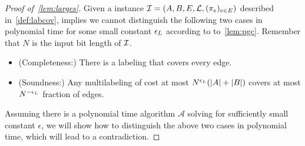 \begin{proof}[Proof of~\cref{lem:larges}]
	Given a \labcov{} instance $\mathcal{I}=(A,B,E,\mathcal{L},(\pi_e)_{e\in E})$ described in~\cref{def:labcov}, \conj{} implies we cannot distinguish the following two cases in polynomial time for some small constant $\epsilon_{L}{}$ according to to~\cref{lem:pgc}. Remember that $N$ is the input bit length of $\mathcal{I}$.
	
	\begin{itemize}
		\item (Completeness:) There is a labeling that covers every edge. 
		
		\item (Soundness:) Any multilabeling of cost at most $N^{\epsilon_{L}{}}(|A|+|B|)$ covers at most $N^{-\epsilon_{L}{}}$ fraction of edges.      	
	\end{itemize}
	
	
	Assuming there is a polynomial time algorithm $\mathcal{A}$ solving  for sufficiently small constant $\epsilon$, we will show how to distinguish the above two cases in polynomial time, which will lead to a contradiction.
	
	

\end{proof}
